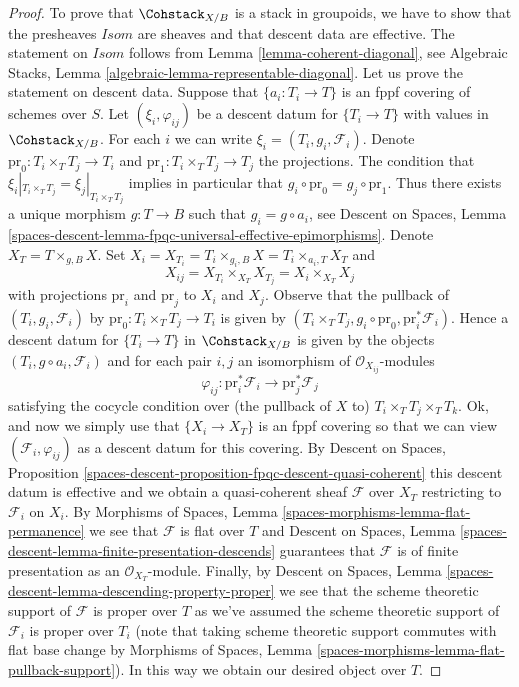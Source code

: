 \begin{proof}
To prove that $\Cohstack_{X/B}$ is a stack in groupoids, we have to show
that the presheaves $\mathit{Isom}$ are sheaves and that descent data are
effective. The statement on $\mathit{Isom}$ follows from
Lemma \ref{lemma-coherent-diagonal}, see
Algebraic Stacks, Lemma \ref{algebraic-lemma-representable-diagonal}.
Let us prove the statement on descent data.
Suppose that $\{a_i : T_i \to T\}$ is an fppf covering of schemes over $S$.
Let $(\xi_i, \varphi_{ij})$ be a descent datum for $\{T_i \to T\}$
with values in $\Cohstack_{X/B}$.
For each $i$ we can write $\xi_i = (T_i, g_i, \mathcal{F}_i)$.
Denote $\text{pr}_0 : T_i \times_T T_j \to T_i$ and
$\text{pr}_1 : T_i \times_T T_j \to T_j$ the projections.
The condition that $\xi_i|_{T_i \times_T T_j} = \xi_j|_{T_i \times_T T_j}$
implies in particular that $g_i \circ \text{pr}_0 = g_j \circ \text{pr}_1$.
Thus there exists a unique morphism $g : T \to B$ such that
$g_i = g \circ a_i$, see
Descent on Spaces, Lemma
\ref{spaces-descent-lemma-fpqc-universal-effective-epimorphisms}.
Denote $X_T = T \times_{g, B} X$. Set
$X_i = X_{T_i} = T_i \times_{g_i, B} X = T_i \times_{a_i, T} X_T$
and
$$
X_{ij} = X_{T_i} \times_{X_T} X_{T_j} = X_i \times_{X_T} X_j
$$
with projections $\text{pr}_i$ and $\text{pr}_j$ to $X_i$ and $X_j$.
Observe that the pullback of $(T_i, g_i, \mathcal{F}_i)$
by $\text{pr}_0 : T_i \times_T T_j \to T_i$ is given by
$(T_i \times_T T_j, g_i \circ \text{pr}_0, \text{pr}_i^*\mathcal{F}_i)$.
Hence a descent datum for $\{T_i \to T\}$ in $\Cohstack_{X/B}$
is given by the objects $(T_i, g \circ a_i, \mathcal{F}_i)$
and for each pair $i, j$ an isomorphism of $\mathcal{O}_{X_{ij}}$-modules
$$
\varphi_{ij} :
\text{pr}_i^*\mathcal{F}_i \longrightarrow \text{pr}_j^*\mathcal{F}_j
$$
satisfying the cocycle condition over (the pullback of $X$ to)
$T_i \times_T T_j \times_T T_k$.
Ok, and now we simply use that $\{X_i \to X_T\}$ is an fppf covering
so that we can view $(\mathcal{F}_i, \varphi_{ij})$ as a descent datum
for this covering. By
Descent on Spaces, Proposition
\ref{spaces-descent-proposition-fpqc-descent-quasi-coherent}
this descent datum is effective and we obtain a quasi-coherent
sheaf $\mathcal{F}$ over $X_T$ restricting to $\mathcal{F}_i$ on $X_i$.
By Morphisms of Spaces, Lemma \ref{spaces-morphisms-lemma-flat-permanence}
we see that $\mathcal{F}$ is flat over $T$ and
Descent on Spaces, Lemma
\ref{spaces-descent-lemma-finite-presentation-descends}
guarantees that $\mathcal{F}$ is of finite presentation as an
$\mathcal{O}_{X_T}$-module. Finally, by
Descent on Spaces, Lemma \ref{spaces-descent-lemma-descending-property-proper}
we see that the scheme theoretic support of $\mathcal{F}$ is proper over
$T$ as we've assumed the scheme theoretic support of $\mathcal{F}_i$
is proper over $T_i$ (note that taking scheme theoretic support commutes
with flat base change by
Morphisms of Spaces, Lemma \ref{spaces-morphisms-lemma-flat-pullback-support}).
In this way we obtain our desired object over $T$.
\end{proof}

